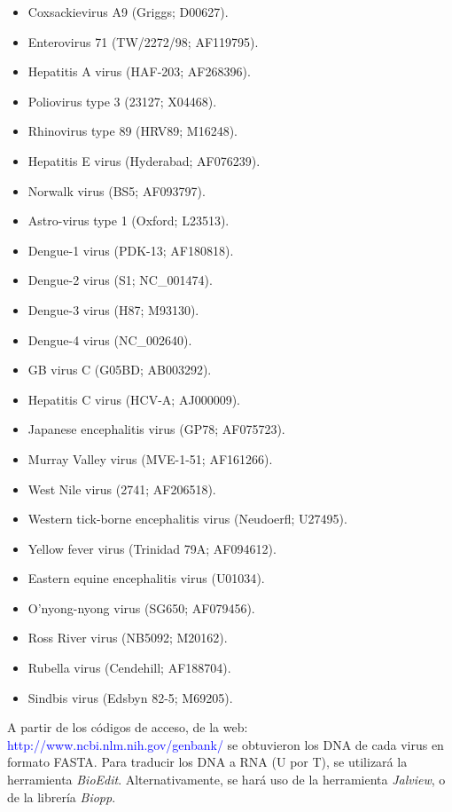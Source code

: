 \documentclass[12pt,a4paper,spanish]{article}
\begin{document}
		\begin{itemize}
			\item Coxsackievirus A9 (Griggs; \textsc{D00627}).
			\item Enterovirus 71 (TW/2272/98; \textsc{AF119795}).
			\item Hepatitis A virus (HAF-203; \textsc{AF268396}).
			\item Poliovirus type 3 (23127; \textsc{X04468}).
			\item Rhinovirus type 89 (HRV89; \textsc{M16248}).
			\item Hepatitis E virus (Hyderabad; \textsc{AF076239}).
			\item Norwalk virus (BS5; \textsc{AF093797}).
			\item Astro-virus type 1 (Oxford; \textsc{L23513}).
			\item Dengue-1 virus (PDK-13; \textsc{AF180818}).
			\item Dengue-2 virus (S1; \textsc{NC\_001474}).
			\item Dengue-3 virus (H87; \textsc{M93130}).
			\item Dengue-4 virus (\textsc{NC\_002640}).
			\item GB virus C (G05BD; \textsc{AB003292}).
			\item Hepatitis C virus (HCV-A; \textsc{AJ000009}).
			\item Japanese encephalitis virus (GP78; \textsc{AF075723}).
			\item Murray Valley virus (MVE-1-51; \textsc{AF161266}).
			\item West Nile virus (2741; \textsc{AF206518}).
			\item Western tick-borne encephalitis virus (Neudoerfl; \textsc{U27495}).
			\item Yellow fever virus (Trinidad 79A; \textsc{AF094612}).
			\item Eastern equine encephalitis virus (\textsc{U01034}).
			\item O’nyong-nyong virus (SG650; \textsc{AF079456}).
			\item Ross River virus (NB5092; \textsc{M20162}).
			\item Rubella virus (Cendehill; \textsc{AF188704}).
			\item Sindbis virus (Edsbyn 82-5; \textsc{M69205}).
		\end{itemize}

		\par A partir de los códigos de acceso, de la web: \textcolor{blue}{http://www.ncbi.nlm.nih.gov/genbank/} se 			obtuvieron los DNA de cada virus en formato FASTA. Para traducir los DNA a RNA (\textsc{U} por \textsc{T}), se 			utilizará la herramienta \textit{BioEdit}. Alternativamente, se hará uso de la herramienta \textit{Jalview}, o de 			la librería \textit{Biopp}. 
\end{document}

